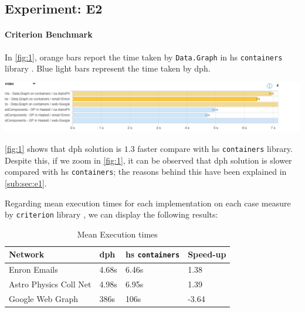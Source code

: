 \documentclass[preprint]{elsarticle}
\begin{document}
\subsection{Experiment: E2}
\paragraph{Criterion Benchmark}
In \autoref{fig:1}, orange bars report the time taken by \texttt{Data.Graph} in \acrshort{hs} \texttt{containers} library \cite{containers}. Blue light bars represent the time taken by \acrshort{dph}.

\begin{minipage}[t]{\linewidth}
  \includegraphics[width=\textwidth]{bench_1.png}
  \captionsetup{type=figure}
  \label{fig:1}
\end{minipage}

\autoref{fig:1} shows that \acrshort{dph} solution is $1.3$ faster compare with \acrshort{hs} \texttt{containers} library. Despite this, if we zoom  in \autoref{fig:1}, it can be observed that \acrshort{dph} solution is slower compared with \acrshort{hs} \texttt{containers}; the reasons behind this have been explained in \autoref{sub:sec:e1}.

Regarding mean execution times for each implementation on each case measure by \texttt{criterion} library \cite{criterion}, we can display the following results:

\begin{table}[H]
  \centering
  \begin{tabular}{|l|l|l|l|}
   \hline
   \textbf{Network} & \textbf{\acrshort{dph}} & \textbf{\acrshort{hs} \texttt{containers}} & \textbf{Speed-up}\\
   \hline
   Enron Emails & 4.68s &  6.46s & 1.38\\
   \hline
   Astro Physics Coll Net & 4.98s & 6.95s  & 1.39\\
   \hline
   Google Web Graph & 386s & 106s & -3.64\\
   \hline
  \end{tabular}
 \caption{Mean Execution times}
 \label{table:6}
 \end{table}
\end{document}
